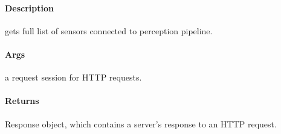 \documentclass[letterpaper,10pt,english]{sphinxmanual}
\begin{document}
\begin{fulllineitems}
\label{\detokenize{gemini_perception_API:gemini_perception_API.get_all_sensors}}
\pysigstartsignatures
{}
\pysigstopsignatures

\paragraph{Description}
\label{\detokenize{gemini_perception_API:id8}}
\sphinxAtStartPar
gets full list of sensors connected to perception pipeline.


\paragraph{Args}
\label{\detokenize{gemini_perception_API:id9}}\begin{description}
\sphinxAtStartPar
a request session for HTTP requests.

\end{description}


\paragraph{Returns}
\label{\detokenize{gemini_perception_API:id10}}\begin{description}
\sphinxAtStartPar
Response object, which contains a server’s response to an HTTP request.

\end{description}

\end{fulllineitems}

\end{document}
